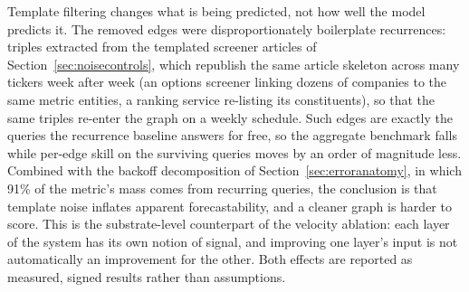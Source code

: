 \documentclass[a4paper,12pt]{report}
\begin{document}
Template filtering changes what is being predicted, not how well the
model predicts it. The removed edges were
disproportionately boilerplate recurrences: triples extracted from the
templated screener articles of Section~\ref{sec:noisecontrols}, which
republish the same article skeleton across many tickers week after week
(an options screener linking dozens of companies to the same metric
entities, a ranking service re-listing its constituents), so that the
same triples re-enter the graph on a weekly schedule. Such edges are
exactly the queries the
recurrence baseline answers for free, so the aggregate benchmark falls
while per-edge skill on the surviving queries moves by an order of
magnitude less. Combined
with the backoff decomposition of Section~\ref{sec:erroranatomy}, in
which 91\% of the metric's mass comes from recurring queries, the
conclusion is that template noise inflates apparent
forecastability, and a cleaner graph is harder to score. This
is the substrate-level counterpart of the velocity ablation: each layer
of the system has its own notion of signal, and improving one layer's
input is not automatically an improvement for the other. Both effects
are reported as measured, signed results rather than assumptions.
\end{document}
